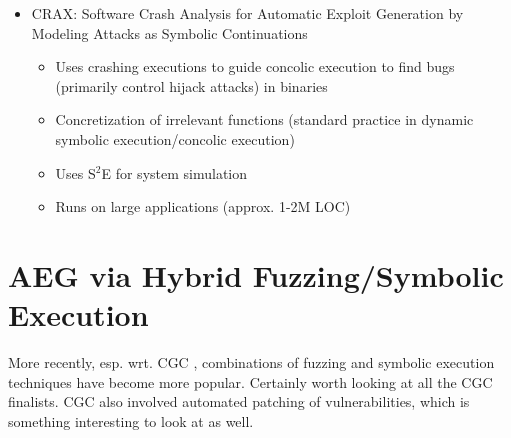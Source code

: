 \documentclass[11pt]{article}
\begin{document}
\begin{itemize}
\item
    CRAX: Software Crash Analysis for Automatic Exploit Generation by Modeling
    Attacks as Symbolic Continuations \cite{CRAX}
    \begin{itemize}
    \item
        Uses crashing executions to guide concolic execution to find bugs
        (primarily control hijack attacks) in binaries
    \item
        Concretization of irrelevant functions (standard practice in dynamic
        symbolic execution/concolic execution)
    \item
        Uses S$^2$E for system simulation
    \item
        Runs on large applications (approx. 1-2M LOC)
    \end{itemize}
\end{itemize}

\section{AEG via Hybrid Fuzzing/Symbolic Execution}

More recently, esp. wrt. CGC \cite{CGC}, combinations of fuzzing and symbolic
execution techniques have become more popular. Certainly worth looking at all
the CGC finalists. CGC also involved automated patching of vulnerabilities,
which is something interesting to look at as well.
\end{document}
